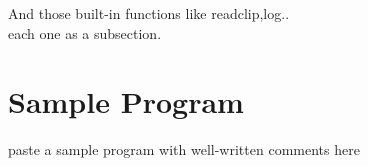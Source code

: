 \documentclass[12pt]{article}
\begin{document}

And those built-in functions like readclip,log..\\ 
each one as a subsection.


\section{Sample Program}
paste a sample program with well-written comments here\\


\end{document}
